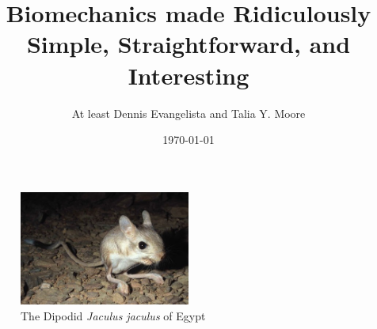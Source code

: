 \documentclass{book}
\title{Biomechanics made Ridiculously Simple, Straightforward, and Interesting}
\author{At least Dennis Evangelista and Talia Y. Moore}
\date{\today}
\newcommand{\species}[1]{\emph{#1}}
\begin{document}
\maketitle



\begin{figure}[h!]
 \label{jaculus}
 \centering
  \includegraphics[width=0.5\textwidth]{jaculus.jpg}
 \caption{The Dipodid \species{Jaculus jaculus} of Egypt}
\end{figure}
\end{document}
